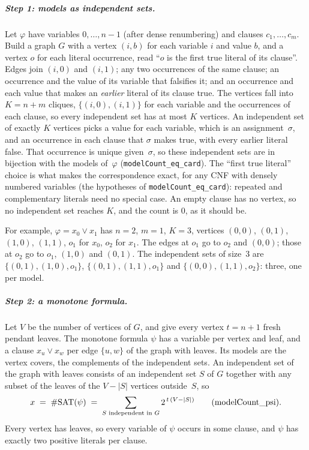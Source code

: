 \documentclass[a4paper,UKenglish,cleveref,autoref,thm-restate]{lipics-v2021}
\begin{document}
\subparagraph*{Step 1: models as independent sets.}
Let $\varphi$ have variables $0, \dots, n-1$ (after dense renumbering) and clauses
$c_1, \dots, c_m$. Build a graph $G$ with a vertex $(i, b)$ for each variable $i$ and value $b$,
and a vertex $o$ for each literal occurrence, read ``$o$ is the first true literal of its
clause''. Edges join $(i, 0)$ and $(i, 1)$; any two occurrences of the same clause; an
occurrence and the value of its variable that falsifies it; and an occurrence and each value
that makes an \emph{earlier} literal of its clause true. The vertices fall into $K = n + m$
cliques, $\{(i,0),(i,1)\}$ for each variable and the occurrences of each clause, so every
independent set has at most $K$ vertices. An independent set of exactly $K$ vertices picks a
value for each variable, which is an assignment~$\sigma$, and an occurrence in each clause that
$\sigma$ makes true, with every earlier literal false. That occurrence is unique given~$\sigma$,
so these independent sets are in bijection with the models of~$\varphi$
(\lstinline{modelCount_eq_card}). The ``first true literal'' choice is what makes the
correspondence exact, for any CNF with densely numbered variables (the hypotheses of
\lstinline{modelCount_eq_card}): repeated and complementary literals need no special case. An
empty clause has no vertex, so no independent set reaches $K$, and the count is $0$, as it should
be.

For example, $\varphi = x_0 \lor x_1$ has $n = 2$, $m = 1$, $K = 3$, vertices $(0,0)$,
$(0,1)$, $(1,0)$, $(1,1)$, $o_1$ for $x_0$, $o_2$ for $x_1$. The edges at $o_1$ go to $o_2$ and
$(0,0)$; those at $o_2$ go to $o_1$, $(1,0)$ and $(0,1)$. The independent sets of size~3 are
$\{(0,1), (1,0), o_1\}$, $\{(0,1), (1,1), o_1\}$ and $\{(0,0), (1,1), o_2\}$: three, one per model.

\subparagraph*{Step 2: a monotone formula.}
Let $V$ be the number of vertices of $G$, and give every vertex $t = n + 1$ fresh pendant
leaves. The monotone formula $\psi$ has a variable per vertex and leaf, and a clause $x_u \lor
x_w$ per edge $\{u, w\}$ of the graph with leaves. Its models are the vertex covers, the
complements of the independent sets. An independent set of the graph with leaves consists of an
independent set $S$ of $G$ together with any subset of the leaves of the $V - |S|$ vertices
outside~$S$, so
\[
x \;=\; \#\mathrm{SAT}(\psi) \;=\; \sum_{S \text{ independent in } G} 2^{\,t\,(V - |S|)}
\qquad (\text{\lstinline{modelCount_psi}}).
\]
Every vertex has leaves, so every variable of $\psi$ occurs in some clause, and $\psi$ has exactly two
positive literals per clause.
\end{document}
